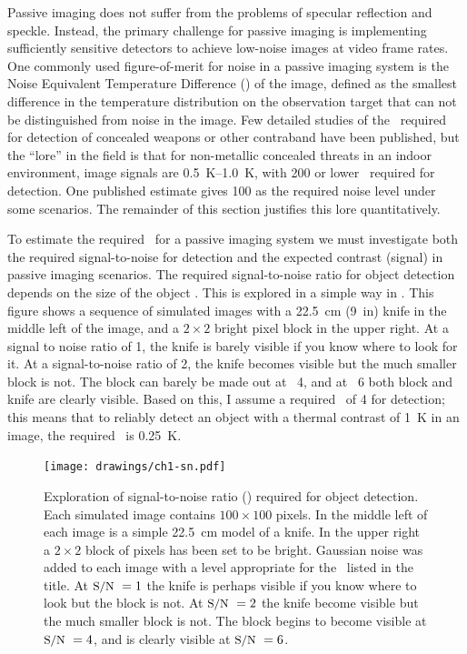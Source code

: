 Passive imaging does not suffer from the problems of specular reflection and speckle.
Instead, the primary challenge for passive imaging is implementing sufficiently sensitive detectors to achieve low-noise images at video frame rates.
One commonly used figure-of-merit for noise in a passive imaging system is the Noise Equivalent Temperature Difference (\NETD) of the image, defined as the smallest difference in the temperature distribution on the observation target that can not be distinguished from noise in the image.
Few detailed studies of the \NETD\ required for detection of concealed weapons or other contraband have been published, but the ``lore'' in the field is that for non-metallic concealed threats in an indoor environment, image signals are \SIrange{0.5}{1.0}{\K}, with \SI{200}{\mK} or lower \NETD\ required for detection.
One published estimate gives \SI{100}{\mK} as the required noise level \cite{salmon_scene_2004} under some scenarios.
The remainder of this section justifies this lore quantitatively.

To estimate the required \NETD\ for a passive imaging system we must investigate both the required signal-to-noise for detection and the expected contrast (signal) in passive imaging scenarios.
The required signal-to-noise ratio for object detection depends on the size of the object \cite{steven_w._smith_scientist_1997}.
This is explored in a simple way in .
This figure shows a sequence of simulated images with a \SI{22.5}{\cm} (\SI{9}{in}) knife in the middle left of the image, and a $2\times2$ bright pixel block in the upper right.
At a signal to noise ratio of 1, the knife is barely visible if you know where to look for it.
At a signal-to-noise ratio of 2, the knife becomes visible but the much smaller block is not.
The block can barely be made out at \SN\ 4, and at \SN\ 6 both block and knife are clearly visible.
Based on this, I assume a required \SN\  of 4 for detection; this means that to reliably detect an object with a thermal contrast of \SI{1}{\K} in an image, the required \NETD\ is \SI{0.25}{\K}.

\begin{figure}
\centering
\texttt{[image: drawings/ch1-sn.pdf]}
\caption[Signal-to-noise ratio for object detection]{
  Exploration of signal-to-noise ratio (\SN) required for object detection.
  Each simulated image contains $100 \times 100$ pixels.
  In the middle left of each image is a simple \SI{22.5}{\cm} model of a knife.
  In the upper right a $2\times2$ block of pixels has been set to be bright.
  Gaussian noise was added to each image with a level appropriate for the \SN\ listed in the title.
  At $\text{\small{S/N}}\ = 1$ the knife is perhaps visible if you know where to look but the block is not.
  At $\text{\small{S/N}}\ = 2$ the knife become visible but the much smaller block is not.
  The block begins to become visible at $\text{\small{S/N}}\ = 4$, and is clearly visible at $\text{\small{S/N}}\ = 6$.
}
\label{fig:ch1-sn}
\end{figure}

